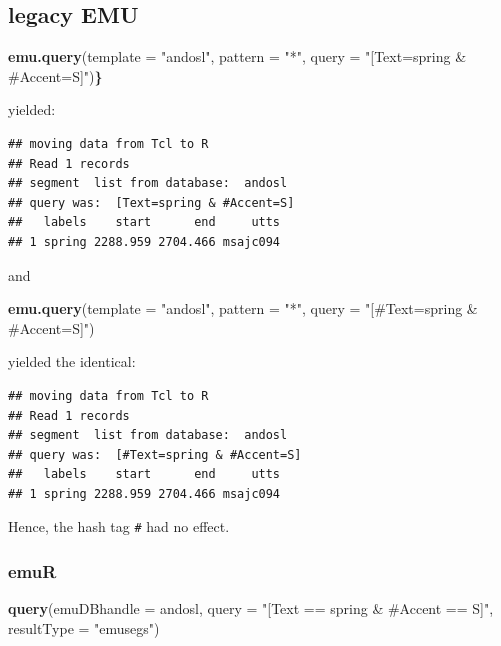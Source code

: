\documentclass[]{book}
\newenvironment{Shaded}{\begin{snugshade}}{\end{snugshade}}
\newcommand{\DataTypeTok}[1]{\textcolor[rgb]{0.13,0.29,0.53}{#1}}
\newcommand{\ErrorTok}[1]{\textcolor[rgb]{0.64,0.00,0.00}{\textbf{#1}}}
\newcommand{\KeywordTok}[1]{\textcolor[rgb]{0.13,0.29,0.53}{\textbf{#1}}}
\newcommand{\NormalTok}[1]{#1}
\newcommand{\StringTok}[1]{\textcolor[rgb]{0.31,0.60,0.02}{#1}}
\theoremstyle{definition}
\theoremstyle{definition}
\theoremstyle{definition}
\theoremstyle{remark}
\begin{document}
\hypertarget{legacy-emu}{%
\subsection{legacy EMU}\label{legacy-emu}}

\begin{Shaded}
\begin{Highlighting}[]
\KeywordTok{emu.query}\NormalTok{(}\DataTypeTok{template =} \StringTok{"andosl"}\NormalTok{, }
          \DataTypeTok{pattern =} \StringTok{"*"}\NormalTok{,}
          \DataTypeTok{query =} \StringTok{"[Text=spring & #Accent=S]"}\NormalTok{)}\ErrorTok{\}}
\end{Highlighting}
\end{Shaded}

yielded:

\begin{verbatim}
## moving data from Tcl to R
## Read 1 records
## segment  list from database:  andosl
## query was:  [Text=spring & #Accent=S]
##   labels    start      end     utts
## 1 spring 2288.959 2704.466 msajc094
\end{verbatim}

and

\begin{Shaded}
\begin{Highlighting}[]
\KeywordTok{emu.query}\NormalTok{(}\DataTypeTok{template =} \StringTok{"andosl"}\NormalTok{,}
          \DataTypeTok{pattern =} \StringTok{"*"}\NormalTok{,}
          \DataTypeTok{query =} \StringTok{"[#Text=spring & #Accent=S]"}\NormalTok{)}
\end{Highlighting}
\end{Shaded}

yielded the identical:

\begin{verbatim}
## moving data from Tcl to R
## Read 1 records
## segment  list from database:  andosl
## query was:  [#Text=spring & #Accent=S]
##   labels    start      end     utts
## 1 spring 2288.959 2704.466 msajc094
\end{verbatim}

Hence, the hash tag \texttt{\#} had no effect.

\hypertarget{emur}{%
\subsubsection{emuR}\label{emur}}

\begin{Shaded}
\begin{Highlighting}[]
\KeywordTok{query}\NormalTok{(}\DataTypeTok{emuDBhandle =}\NormalTok{ andosl,}
      \DataTypeTok{query =} \StringTok{"[Text == spring & #Accent == S]"}\NormalTok{,}
      \DataTypeTok{resultType =} \StringTok{"emusegs"}\NormalTok{)}
\end{Highlighting}
\end{Shaded}
\end{document}
